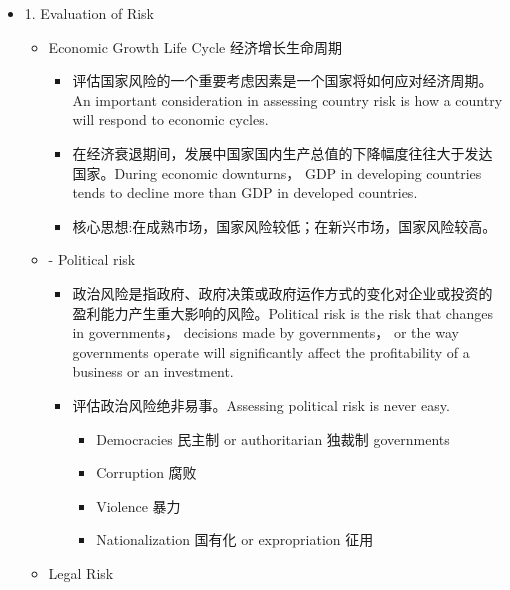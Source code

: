 \begin{itemize}

    \item 1. Evaluation of Risk

\begin{itemize}
\item Economic Growth Life Cycle 经济增长生命周期
\begin{itemize}

    \item 评估国家风险的一个重要考虑因素是一个国家将如何应对经济周期。 An important consideration in assessing country risk is how a country will respond to economic cycles.

\item 在经济衰退期间，发展中国家国内生产总值的下降幅度往往大于发达国家。During economic downturns， GDP in developing countries tends to decline more than GDP in developed countries.

\item 核心思想:在成熟市场，国家风险较低；在新兴市场，国家风险较高。 
\end{itemize}

\item - Political risk
\begin{itemize}


    \item 政治风险是指政府、政府决策或政府运作方式的变化对企业或投资的盈利能力产生重大影响的风险。Political risk is the risk that changes in governments， decisions made by governments， or the way governments operate will significantly affect the profitability of a business or an investment.


    \item 评估政治风险绝非易事。Assessing political risk is never easy.

    \begin{itemize}

        \item Democracies 民主制 or authoritarian 独裁制 governments

        \item Corruption 腐败

 \item Violence 暴力

 \item Nationalization 国有化 or expropriation 征用
\end{itemize}
\end{itemize}

\item Legal Risk
\begin{itemize}


\end{itemize}
\end{itemize}
\end{itemize}
